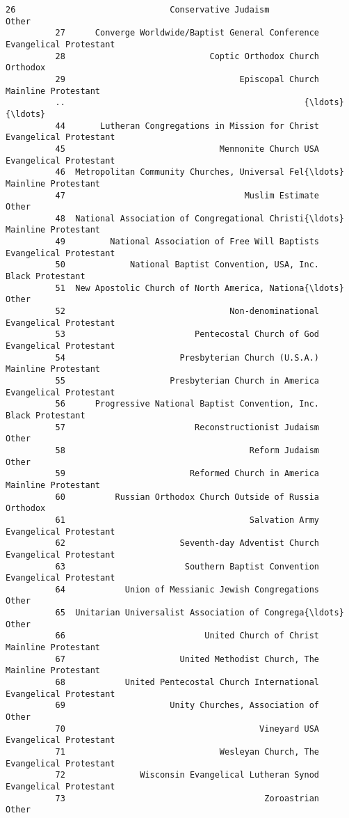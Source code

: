 \documentclass[11pt]{article}
\begin{document}
\begin{Verbatim}[commandchars=\\\{\}]
          26                               Conservative Judaism                   Other   
          27      Converge Worldwide/Baptist General Conference  Evangelical Protestant   
          28                             Coptic Orthodox Church                Orthodox   
          29                                   Episcopal Church     Mainline Protestant   
          ..                                                {\ldots}                     {\ldots}   
          44       Lutheran Congregations in Mission for Christ  Evangelical Protestant   
          45                               Mennonite Church USA  Evangelical Protestant   
          46  Metropolitan Community Churches, Universal Fel{\ldots}     Mainline Protestant   
          47                                    Muslim Estimate                   Other   
          48  National Association of Congregational Christi{\ldots}     Mainline Protestant   
          49         National Association of Free Will Baptists  Evangelical Protestant   
          50             National Baptist Convention, USA, Inc.        Black Protestant   
          51  New Apostolic Church of North America, Nationa{\ldots}                   Other   
          52                                 Non-denominational  Evangelical Protestant   
          53                          Pentecostal Church of God  Evangelical Protestant   
          54                       Presbyterian Church (U.S.A.)     Mainline Protestant   
          55                     Presbyterian Church in America  Evangelical Protestant   
          56      Progressive National Baptist Convention, Inc.        Black Protestant   
          57                          Reconstructionist Judaism                   Other   
          58                                     Reform Judaism                   Other   
          59                         Reformed Church in America     Mainline Protestant   
          60          Russian Orthodox Church Outside of Russia                Orthodox   
          61                                     Salvation Army  Evangelical Protestant   
          62                       Seventh-day Adventist Church  Evangelical Protestant   
          63                        Southern Baptist Convention  Evangelical Protestant   
          64            Union of Messianic Jewish Congregations                   Other   
          65  Unitarian Universalist Association of Congrega{\ldots}                   Other   
          66                            United Church of Christ     Mainline Protestant   
          67                       United Methodist Church, The     Mainline Protestant   
          68            United Pentecostal Church International  Evangelical Protestant   
          69                     Unity Churches, Association of                   Other   
          70                                       Vineyard USA  Evangelical Protestant   
          71                               Wesleyan Church, The  Evangelical Protestant   
          72               Wisconsin Evangelical Lutheran Synod  Evangelical Protestant   
          73                                        Zoroastrian                   Other   
          

\end{Verbatim}
\end{document}
